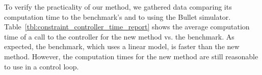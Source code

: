 \begin{table}[t]
\centering
{}
\caption{Mean computation time (s) to compute the gripper motion for a given state. BM: benchmark method; NM: new method.}
\label{tbl:constraint_controller_time_report}
\end{table}



To verify the practicality of our method, we gathered data comparing its computation time to the benchmark's and to using the Bullet simulator. Table~\ref{tbl:constraint_controller_time_report} shows the average computation time of a call to the controller for the new method vs. the benchmark. As expected, the benchmark, which uses a linear model, is faster than the new method. However, the computation times for the new method are still reasonable to use in a control loop.
